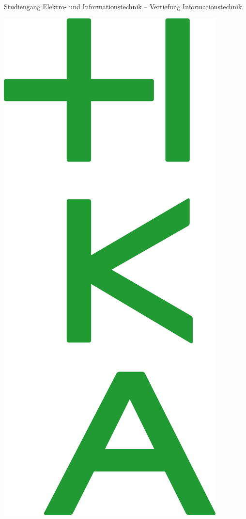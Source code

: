\begin{titlepage}
\begin{minipage}[t]{13cm}
        \Large
        Studiengang Elektro- und Informationstechnik – 
        Vertiefung Informationstechnik
    \end{minipage}
    \hspace{1cm}
    \begin{minipage}[c]{0.2\textwidth}\raggedleft
        \includegraphics[width=\textwidth]{Template_HKA/hka_bachelor.png}
    \end{minipage}
    

\end{titlepage}
